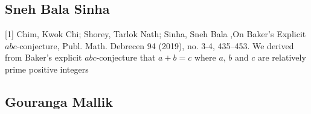 \subsection{Sneh Bala Sinha}

[1] Chim, Kwok Chi; Shorey, Tarlok Nath; Sinha, Sneh Bala ,On Baker's Explicit $abc$-conjecture,  Publ. Math. Debrecen 94 (2019), no. 3-4, 435–453.  We derived from Baker's explicit $abc$-conjecture that $a+b=c$ where $a$, $b$ and $c$ are relatively prime positive integers %


\subsection{Gouranga Mallik}

